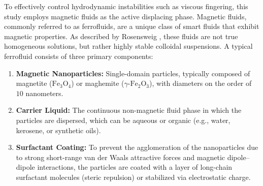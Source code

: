 To effectively control hydrodynamic instabilities such as viscous fingering, this study employs magnetic fluids as the active displacing phase.
Magnetic fluids, commonly referred to as ferrofluids, are a unique class of smart fluids that exhibit magnetic properties.
As described by Rosensweig \cite{rosensweig1985ferrohydrodynamics}, these fluids are not true homogeneous solutions, but rather highly stable colloidal suspensions.
A typical ferrofluid consists of three primary components:
\begin{enumerate}
    \item \textbf{Magnetic Nanoparticles:} Single-domain particles, typically composed of magnetite ($\text{Fe}_3\text{O}_4$) or maghemite ($\gamma\text{-Fe}_2\text{O}_3$), with diameters on the order of $10$ nanometers.
    \item \textbf{Carrier Liquid:} The continuous non-magnetic fluid phase in which the particles are dispersed, which can be aqueous or organic (e.g., water, kerosene, or synthetic oils).
    \item \textbf{Surfactant Coating:} To prevent the agglomeration of the nanoparticles due to strong short-range van der Waals attractive forces and magnetic dipole--dipole interactions, the particles are coated with a layer of long-chain surfactant molecules (steric repulsion) or stabilized via electrostatic charge.
\end{enumerate}

